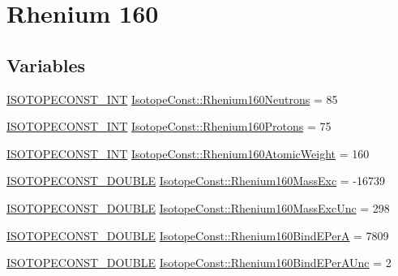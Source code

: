 \hypertarget{group___isotope_const-_rhenium-_re160}{}\section{Rhenium 160}
\label{group___isotope_const-_rhenium-_re160}
\subsection*{Variables}
\begin{DoxyCompactItemize}
\item 
\mbox{\hyperlink{group___isotope_const-_macros_ga5f18360b3e99483a35c32d789e62621c}{I\+S\+O\+T\+O\+P\+E\+C\+O\+N\+S\+T\+\_\+\+I\+NT}} \mbox{\hyperlink{group___isotope_const-_rhenium-_re160_gace01ab5ff5d1e5f2621853a30c6e7a49}{Isotope\+Const\+::\+Rhenium160\+Neutrons}} = 85
\item 
\mbox{\hyperlink{group___isotope_const-_macros_ga5f18360b3e99483a35c32d789e62621c}{I\+S\+O\+T\+O\+P\+E\+C\+O\+N\+S\+T\+\_\+\+I\+NT}} \mbox{\hyperlink{group___isotope_const-_rhenium-_re160_gae52852ace034053523a6bb3f3163488b}{Isotope\+Const\+::\+Rhenium160\+Protons}} = 75
\item 
\mbox{\hyperlink{group___isotope_const-_macros_ga5f18360b3e99483a35c32d789e62621c}{I\+S\+O\+T\+O\+P\+E\+C\+O\+N\+S\+T\+\_\+\+I\+NT}} \mbox{\hyperlink{group___isotope_const-_rhenium-_re160_ga196fc177a8613969dc9fcecbae49af74}{Isotope\+Const\+::\+Rhenium160\+Atomic\+Weight}} = 160
\item 
\mbox{\hyperlink{group___isotope_const-_macros_ga8f45a7272ce02c0b4c65c44636ed719a}{I\+S\+O\+T\+O\+P\+E\+C\+O\+N\+S\+T\+\_\+\+D\+O\+U\+B\+LE}} \mbox{\hyperlink{group___isotope_const-_rhenium-_re160_ga0e3e475e677a7f6962f475a8bf250313}{Isotope\+Const\+::\+Rhenium160\+Mass\+Exc}} = -\/16739
\item 
\mbox{\hyperlink{group___isotope_const-_macros_ga8f45a7272ce02c0b4c65c44636ed719a}{I\+S\+O\+T\+O\+P\+E\+C\+O\+N\+S\+T\+\_\+\+D\+O\+U\+B\+LE}} \mbox{\hyperlink{group___isotope_const-_rhenium-_re160_ga3a0445a22507b42f0c0b0ce4466c65cf}{Isotope\+Const\+::\+Rhenium160\+Mass\+Exc\+Unc}} = 298
\item 
\mbox{\hyperlink{group___isotope_const-_macros_ga8f45a7272ce02c0b4c65c44636ed719a}{I\+S\+O\+T\+O\+P\+E\+C\+O\+N\+S\+T\+\_\+\+D\+O\+U\+B\+LE}} \mbox{\hyperlink{group___isotope_const-_rhenium-_re160_ga20e4a9f852241c8c79ad712e96b81420}{Isotope\+Const\+::\+Rhenium160\+Bind\+E\+PerA}} = 7809
\item 
\mbox{\hyperlink{group___isotope_const-_macros_ga8f45a7272ce02c0b4c65c44636ed719a}{I\+S\+O\+T\+O\+P\+E\+C\+O\+N\+S\+T\+\_\+\+D\+O\+U\+B\+LE}} \mbox{\hyperlink{group___isotope_const-_rhenium-_re160_gaadc97a34e8e884363d8d99983bcabd58}{Isotope\+Const\+::\+Rhenium160\+Bind\+E\+Per\+A\+Unc}} = 2

\end{DoxyCompactItemize}
